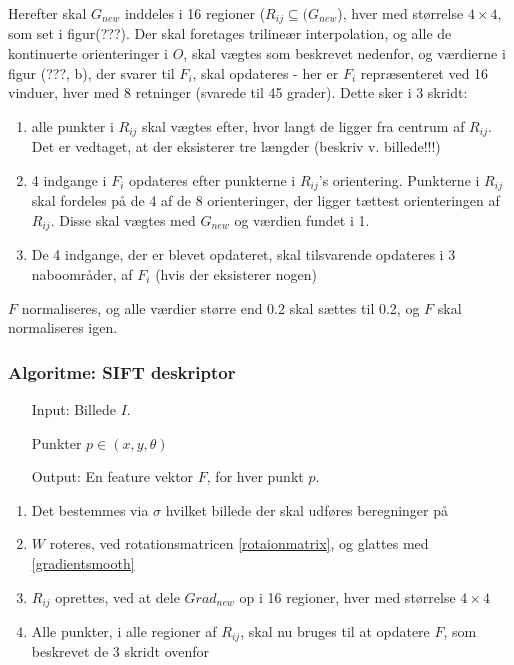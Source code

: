 Herefter skal $G_{new}$ inddeles i 16 regioner ($R_{ij} \subseteq (G_{new}$), hver med størrelse $4\times4$, som set i figur(???). Der skal foretages trilineær interpolation, og alle de kontinuerte orienteringer i $O$, skal vægtes som beskrevet nedenfor, og værdierne i figur (???, b), der svarer til $F_i$, skal opdateres - her er $F_i$ repræsenteret ved 16 vinduer, hver med 8 retninger (svarede til 45 grader). Dette sker i 3 skridt:
\begin{enumerate}
\item{ alle punkter i $R_{ij}$ skal vægtes efter, hvor langt de ligger fra centrum af $R_{ij}$. Det er vedtaget, at der eksisterer tre længder (beskriv v. billede!!!)}
\item{ 4 indgange i $F_i$ opdateres efter punkterne i $R_{ij}$'s orientering. Punkterne i $R_{ij}$ skal fordeles på de 4 af de 8 orienteringer, der ligger tættest orienteringen af $R_{ij}$. Disse skal vægtes med $G_{new}$ og værdien fundet i 1. }
\item{ De 4 indgange, der er blevet opdateret, skal tilsvarende opdateres i 3 naboområder, af $F_i$ (hvis der eksisterer nogen)}
\end{enumerate}

$F$ normaliseres, og alle værdier større end 0.2 skal sættes til 0.2, og $F$ skal normaliseres igen.
\subsubsection*{Algoritme: SIFT deskriptor}
\begin{enumerate}
\item[Input:] Billede $I$.
\item[] Punkter $p \in (x, y, \theta)$
\item[Output:] En feature vektor $F$, for hver punkt $p$.
\end{enumerate}
\begin{enumerate}
\item Det bestemmes via $\sigma$ hvilket billede der skal udføres beregninger på
\item $W$ roteres, ved rotationsmatricen \eqref{rotaionmatrix}, og glattes med \eqref{gradientsmooth}
\item $R_{ij}$ oprettes, ved at dele $Grad_{new}$ op i 16 regioner, hver med størrelse $4\times4$
\item Alle punkter, i alle regioner af $R_{ij}$, skal nu bruges til at opdatere $F$, som beskrevet de 3 skridt ovenfor
\end{enumerate}